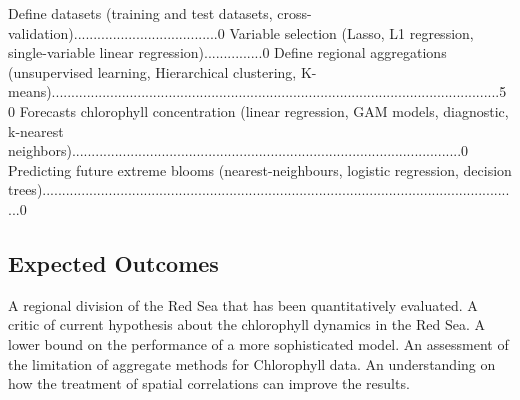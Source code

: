 Define datasets (training and test datasets, cross-validation).....................................0%
Variable selection (Lasso, L1 regression, single-variable linear regression)...............0%
Define regional aggregations (unsupervised learning, Hierarchical clustering, K-means)...................................................................................................................50%
Forecasts chlorophyll concentration (linear regression, GAM models, diagnostic, k-nearest neighbors)....................................................................................................0%
Predicting future extreme blooms (nearest-neighbours, logistic regression, decision trees)...........................................................................................................................0%

\subsection{Expected Outcomes}

A regional division of the Red Sea that has been quantitatively evaluated.
A critic of current hypothesis about the chlorophyll dynamics in the Red Sea.
A lower bound on the performance of a more sophisticated model.
An assessment of the limitation of aggregate methods for Chlorophyll data.
An understanding on how the treatment of spatial correlations can improve the results.

